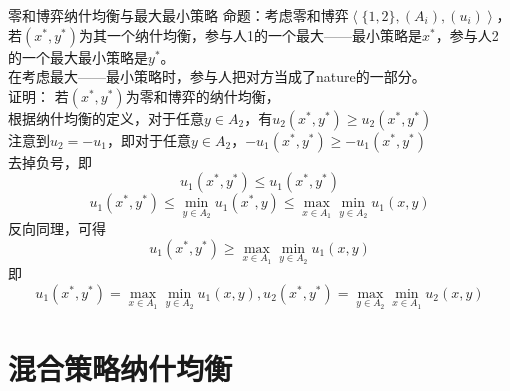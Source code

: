 \documentclass{beamer}
\begin{document}
\begin{frame}{零和博弈纳什均衡与最大最小策略}
	命题：考虑零和博弈$\left\langle \{1,2\} , \left(A_{i}\right) , \left(u_{i}\right)\right\rangle$，若$\left(x^{*},y^{*}\right)$为其一个纳什均衡，参与人1的一个最大——最小策略是$x^{*}$，参与人2的一个最大最小策略是$y^{*}$。\\
	在考虑最大——最小策略时，参与人把对方当成了nature的一部分。\\
	证明：
	若$\left(x^{*},y^{*}\right)$为零和博弈的纳什均衡，\\
	根据纳什均衡的定义，对于任意$y\in A_{2}$，有$u_{2}\left(x^{*},y^{*}\right)\geq u_{2}\left(x^{*},y^{*}\right)$\\
	注意到$u_{2}=-u_{1}$，即对于任意$y\in A_{2}$，$-u_{1}\left(x^{*},y^{*}\right)\geq -u_{1}\left(x^{*},y^{*}\right)$\\
	去掉负号，即
	$$u_{1}\left(x^{*},y^{*}\right)\leq u_{1}\left(x^{*},y^{*}\right)$$
	$$u_{1}\left(x^{*},y^{*}\right)\leq \min_{y\in A_{2}} u_{1}\left(x^{*},y\right)\leq \max_{x\in A_{1}}\min_{y\in A_{2}} u_{1}\left(x,y\right)$$
	反向同理，可得
	$$u_{1}\left(x^{*},y^{*}\right)\geq \max_{x\in A_{1}}\min_{y\in A_{2}} u_{1}\left(x,y\right)$$
	即
	$$u_{1}\left(x^{*},y^{*}\right) = \max_{x\in A_{1}}\min_{y\in A_{2}} u_{1}\left(x,y\right),u_{2}\left(x^{*},y^{*}\right) = \max_{y\in A_{2}}\min_{x\in A_{1}} u_{2}\left(x,y\right)$$
\end{frame}

\section{混合策略纳什均衡}
\end{document}
